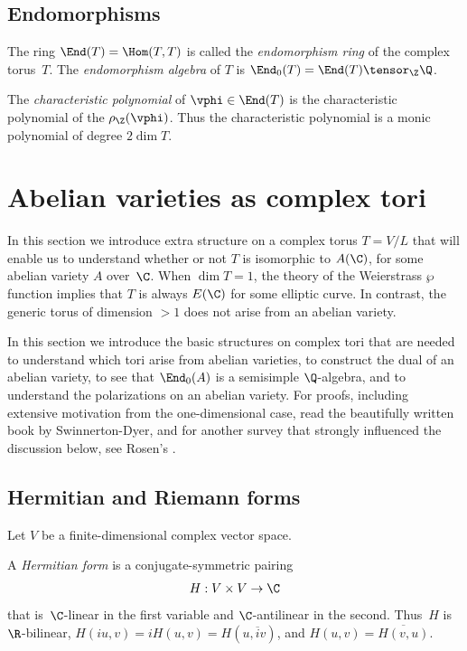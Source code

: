 \documentclass{report}
\begin{document}
\subsection{Endomorphisms}
The ring $\End(T)=\Hom(T,T)$ is called the {\em endomorphism ring}
of the complex torus~$T$.  The {\em endomorphism algebra} of $T$
is $\End_0(T) = \End(T)\tensor_\Z\Q$.

\begin{definition}
The {\em characteristic polynomial} of $\vphi\in\End(T)$ is the
characteristic polynomial of the $\rho_\Z(\vphi)$.  Thus the
characteristic polynomial is a monic polynomial of degree $2\dim
T$.
\end{definition}


\section{Abelian varieties as complex tori}
In this section we introduce extra structure on a complex torus
$T=V/L$ that will enable us to understand whether or not $T$ is
isomorphic to $A(\C)$, for some abelian variety $A$ over~$\C$.
When $\dim T=1$, the theory of the Weierstrass $\wp$ function
implies that $T$ is always $E(\C)$ for some elliptic curve. In
contrast, the generic torus of dimension $>1$ does not arise from
an abelian variety.

In this section we introduce the basic structures on complex tori
that are needed to understand which tori arise from abelian
varieties, to construct the dual of an abelian variety, to see
that $\End_0(A)$ is a semisimple $\Q$-algebra, and to understand
the polarizations on an abelian variety.   For proofs, including
extensive motivation from the one-dimensional case, read the
beautifully written book \cite{swinnerton-dyer:abvars} by
Swinnerton-Dyer, and for another survey that strongly influenced
the discussion below, see Rosen's \cite{rosen:abvars}.


\subsection{Hermitian and Riemann forms}
Let $V$ be a finite-dimensional complex vector space.
\begin{definition}
A {\em Hermitian form} is a conjugate-symmetric pairing
\[
  H:V\times V \to \C
\]
that is~$\C$-linear in the first variable and $\C$-antilinear in
the second.  Thus~$H$ is $\R$-bilinear,
$H(iu,v)=iH(u,v)=H(u,\overline{i}v)$, and
$H(u,v)=\overline{H(v,u)}$.
\end{definition}
\end{document}
